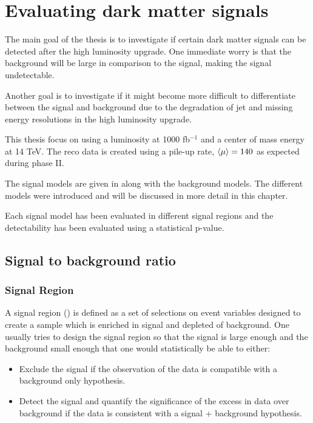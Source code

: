 \chapter{Evaluating dark matter signals}

The main goal of the thesis is to investigate if certain dark matter signals can be detected after the high luminosity upgrade. One immediate worry is that the background will be large in comparison to the signal, making the signal undetectable.

Another goal is to investigate if it might become more difficult to differentiate between the signal and background due to the degradation of jet and missing energy resolutions in the high luminosity upgrade.

This thesis focus on using a luminosity at 1000 fb$^{-1}$ and a center of mass energy at 14 TeV. The reco data is created using a pile-up rate, $\left<\mu\right> = 140$ as expected during phase II.

The signal models are given in  along with the background models. The different models were introduced  and will be discussed in more detail in this chapter.

Each signal model has been evaluated in different signal regions and the detectability has been evaluated using a statistical p-value. 

\newpage
\section{Signal to background ratio}
\subsection{Signal Region}
A signal region (\abbrSR) is defined as a set of selections on event variables designed to create a sample which is enriched in signal and depleted of background. One usually tries to design the signal region so that the signal is large enough and the background small enough that one would statistically be able to either:
\begin{itemize}
\item Exclude the signal if the observation of the data is compatible with a background only hypothesis.
\item Detect the signal and quantify the significance of the excess in data over background if the data is consistent with a signal + background hypothesis.
\end{itemize}

